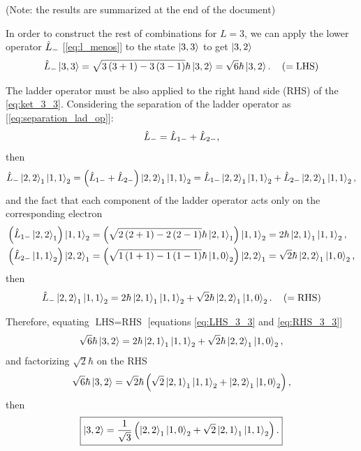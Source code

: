 (Note: the results are summarized at the end of the document)

In order to construct the rest of combinations for $L=3$, we can apply the lower operator $\hat{L}_{-}$ [\cref{eq:l_menos}] to the
state $\Ket{3,3}$ to get $\Ket{3,2}$
\begin{equation}\label{eq:LHS_3_3}
    \hat{L}_{-} \Ket{3,3} = \sqrt{3\left( 3 + 1 \right) - 3\left( 3 - 1 \right)} \hbar \Ket{3,2} = \sqrt{6} \hbar \Ket{3,2}. 
    \quad \left( = \text{LHS} \right)
\end{equation}

The ladder operator must be also applied to the right hand side (RHS) of the \cref{eq:ket_3_3}. Considering the separation of the
ladder operator as [\cref{eq:separation_lad_op}]:
\begin{equation}
    \hat{L}_{-} = \hat{L}_{1-} + \hat{L}_{2-},
\end{equation}
then 
\begin{equation}
    \hat{L}_{-} \Ket{2,2}_1 \Ket{1,1}_2 =
    \left( \hat{L}_{1-} + \hat{L}_{2-} \right) \Ket{2,2}_1 \Ket{1,1}_2 =
    \hat{L}_{1-} \Ket{2,2}_1 \Ket{1,1}_2 + \hat{L}_{2-} \Ket{2,2}_1 \Ket{1,1}_2
    ,
\end{equation}
and the fact that each component of the ladder operator acts only on the corresponding electron
\begin{align}
    \left( \hat{L}_{1-} \Ket{2,2}_1 \right) \Ket{1,1}_2 &= \left( \sqrt{2\left( 2 + 1 \right) - 2\left( 2 - 1 \right)} \hbar \Ket{2,1}_1 \right) \Ket{1,1}_2 = 2 \hbar \Ket{2,1}_1 \Ket{1,1}_2 , \\
    \left( \hat{L}_{2-} \Ket{1,1}_2 \right) \Ket{2,2}_1 &= \left( \sqrt{1\left( 1 + 1 \right) - 1\left( 1 - 1 \right)} \hbar \Ket{1,0}_2 \right) \Ket{2,2}_1 = \sqrt{2} \hbar \Ket{2,2}_1 \Ket{1,0}_2,
\end{align}
then 
\begin{equation}\label{eq:RHS_3_3}   
    \hat{L}_{-} \Ket{2,2}_1 \Ket{1,1}_2 = 2 \hbar \Ket{2,1}_1 \Ket{1,1}_2 +  \sqrt{2} \hbar \Ket{2,2}_1 \Ket{1,0}_2.
     \quad \left( = \text{RHS} \right)
\end{equation}

Therefore, equating $\text{LHS} = \text{RHS}$ [equations \cref{eq:LHS_3_3} and \cref{eq:RHS_3_3}] 
\begin{equation}
    \sqrt{6} \hbar \Ket{3,2} 
    = 2 \hbar \Ket{2,1}_1 \Ket{1,1}_2 +  \sqrt{2} \hbar \Ket{2,2}_1 \Ket{1,0}_2,
\end{equation}
and factorizing $\sqrt{2} \hbar $ on the RHS
\begin{equation}
    \sqrt{6} \hbar \Ket{3,2} 
    = \sqrt{2} \hbar \left( \sqrt{2} \Ket{2,1}_1 \Ket{1,1}_2 + \Ket{2,2}_1 \Ket{1,0}_2 \right),
\end{equation}
then
\begin{equation}\label{eq:ket_3_2}
    \boxed{
        \Ket{3,2} = \frac{1}{\sqrt{3}} \left( \Ket{2,2}_1 \Ket{1,0}_2 + \sqrt{2} \Ket{2,1}_1 \Ket{1,1}_2 \right).
    }
\end{equation}

